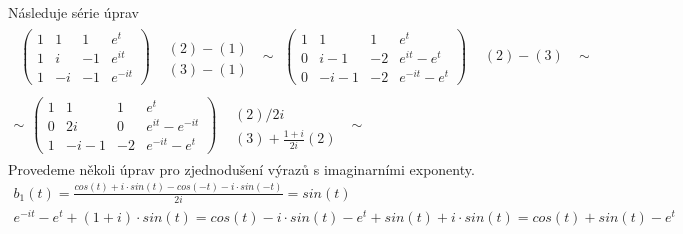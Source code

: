 Následuje série úprav
\begin{equation*}
\begin{array}{l}
 \begin{array}{lc}
  \left(
   \begin{array}{ccc|c}
    1 & 1 & 1 & e^t\\
    1 & i & -1 & e^{it}\\
    1 & -i & -1 & e^{-it}
   \end{array}
  \right) & 
  \begin{array}{c}
    \\
    (2) - (1)\\
    (3) - (1)
  \end{array}
 \end{array}
 \sim
 \begin{array}{lc}
  \left(
   \begin{array}{ccc|c}
    1 & 1 & 1 & e^t\\
    0 & i - 1 & -2 & e^{it} - e^t\\
    0 & -i - 1 & -2 & e^{-it}- e^t
   \end{array}
  \right) & 
  \begin{array}{c}
    \\
    (2) - (3)\\
    ~
  \end{array}
 \end{array}
 \sim \\
 \sim
 \begin{array}{lc}
  \left(
   \begin{array}{ccc|c}
    1 & 1 & 1 & e^t\\
    0 & 2i & 0 & e^{it} - e^{-it}\\
    1 & -i-1 & -2 & e^{-it} - e^t
   \end{array}
  \right) & 
  \begin{array}{c}
    ~\\
    (2)/2i\\
    (3) + \frac{1+i}{2i}(2) 
  \end{array}
 \end{array}\sim
\end{array}
\end{equation*}
Provedeme několi úprav pro zjednodušení výrazů s imaginarními exponenty.
\begin{equation*}
 \begin{array}{l}
  b_1(t) = \frac{cos(t) + i\cdot sin(t) - cos(-t) - i\cdot sin(-t)}{2i} = sin(t)\\
 e^{-it} - e^t + (1 +i)\cdot sin(t) = cos(t) - i\cdot sin(t) - e^t + sin(t) + i\cdot sin(t) = cos(t) + sin(t) - e^t \\
 \end{array}
\end{equation*}

